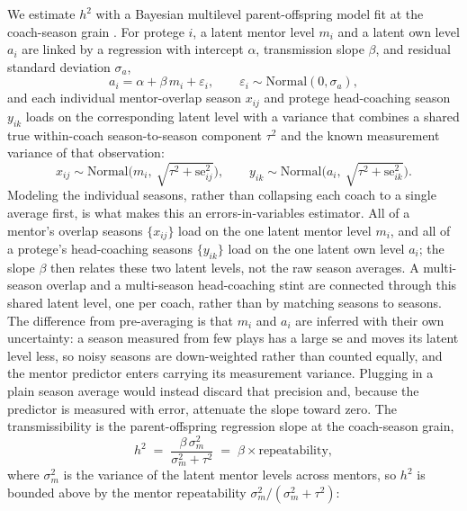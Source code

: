 \documentclass[
  journal=ehs,
  manuscript=article,
  year=2026,
  volume=8,
]{cup-journal}
\begin{document}
We estimate $h^{2}$ with a Bayesian multilevel parent-offspring model fit at the
coach-season grain \parencite{wilson2010, nakagawa2010}. For protege $i$, a latent
mentor level $m_i$ and a latent own level $a_i$ are linked by a regression with
intercept $\alpha$, transmission slope $\beta$, and residual standard deviation
$\sigma_a$,
\begin{equation}
  a_i = \alpha + \beta\, m_i + \varepsilon_i, \qquad \varepsilon_i \sim \mathrm{Normal}(0,\sigma_a),
\end{equation}
and each individual mentor-overlap season $x_{ij}$ and protege head-coaching season
$y_{ik}$ loads on the corresponding latent level with a variance that combines a
shared true within-coach season-to-season component $\tau^2$ and the known
measurement variance of that observation:
\begin{equation}
  x_{ij}\sim\mathrm{Normal}\!\big(m_i,\ \sqrt{\tau^2+\mathrm{se}_{ij}^2}\big), \qquad
  y_{ik}\sim\mathrm{Normal}\!\big(a_i,\ \sqrt{\tau^2+\mathrm{se}_{ik}^2}\big).
\end{equation}
Modeling the individual seasons, rather than collapsing each coach to a single average
first, is what makes this an errors-in-variables estimator. All of a mentor's overlap
seasons $\{x_{ij}\}$ load on the one latent mentor level $m_i$, and all of a protege's
head-coaching seasons $\{y_{ik}\}$ load on the one latent own level $a_i$; the slope
$\beta$ then relates these two latent levels, not the raw season averages. A
multi-season overlap and a multi-season head-coaching stint are connected through this
shared latent level, one per coach, rather than by matching seasons to seasons. The
difference from pre-averaging is that $m_i$ and $a_i$ are inferred with their own
uncertainty: a season measured from few plays has a large $\mathrm{se}$ and moves its
latent level less, so noisy seasons are down-weighted rather than counted equally, and
the mentor predictor enters carrying its measurement variance. Plugging in a plain
season average would instead discard that precision and, because the predictor is
measured with error, attenuate the slope toward zero. The
transmissibility is the parent-offspring regression slope at the coach-season
grain,
\begin{equation}
  h^{2} \;=\; \frac{\beta\,\sigma_m^2}{\sigma_m^2+\tau^2}
        \;=\; \beta\times \text{repeatability},
  \label{eq:h2}
\end{equation}
where $\sigma_m^2$ is the variance of the latent mentor levels across mentors, so
$h^{2}$ is bounded above by the mentor repeatability $\sigma_m^2/(\sigma_m^2+\tau^2)$:
\end{document}
